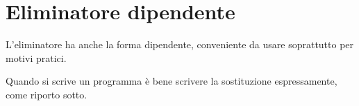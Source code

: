 \section{Eliminatore dipendente}
\label{subsec:eliminatore dipendente-lista}
L'eliminatore ha anche la forma dipendente, conveniente da usare soprattutto per motivi pratici.
\small
\begin{adjustwidth}{-6em}{}
\begin{prooftree}
\end{prooftree}
\end{adjustwidth}
\normalsize
Quando si scrive un programma \`e bene scrivere la sostituzione espressamente, come riporto sotto.
\small
\begin{adjustwidth}{-7em}{}
\begin{prooftree}
\end{prooftree}
\end{adjustwidth}

\normalsize

